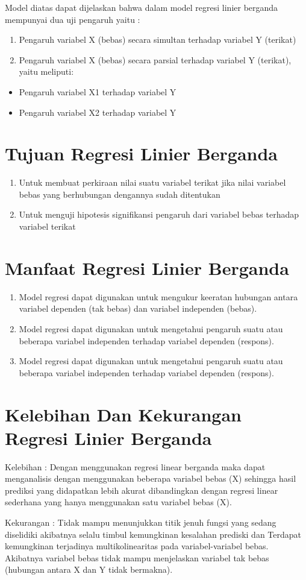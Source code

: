 \par Model diatas dapat dijelaskan bahwa dalam model regresi linier berganda mempunyai dua uji pengaruh yaitu :  
\begin{enumerate}
\item 	Pengaruh variabel X (bebas) secara simultan terhadap variabel Y (terikat)  
\item 	Pengaruh variabel X (bebas) secara parsial terhadap variabel Y (terikat), yaitu meliputi:  
\end{enumerate}
    \begin{itemize}
               \item Pengaruh variabel X1 terhadap variabel Y  
               \item Pengaruh variabel X2 terhadap variabel Y 
               \end{itemize}
\section{Tujuan Regresi Linier Berganda}
\begin{enumerate}
\item Untuk membuat perkiraan nilai suatu variabel terikat jika nilai variabel bebas yang berhubungan dengannya sudah ditentukan
\item Untuk menguji hipotesis signifikansi pengaruh dari variabel bebas terhadap variabel terikat
\end{enumerate}

\section{Manfaat Regresi Linier Berganda}
\begin{enumerate}
\item Model regresi dapat digunakan untuk mengukur keeratan hubungan antara variabel dependen (tak bebas) dan variabel independen (bebas). 
\item Model regresi dapat digunakan untuk mengetahui pengaruh suatu atau beberapa variabel independen terhadap variabel dependen (respons).
\item Model regresi dapat digunakan untuk mengetahui pengaruh suatu atau beberapa variabel independen terhadap variabel dependen (respons).
\end{enumerate}

\section{Kelebihan Dan Kekurangan Regresi Linier Berganda}
\par Kelebihan : Dengan menggunakan regresi linear berganda maka dapat menganalisis dengan menggunakan beberapa variabel bebas (X) sehingga hasil prediksi yang didapatkan lebih akurat dibandingkan dengan regresi linear sederhana yang hanya menggunakan satu variabel bebas (X). 
\par Kekurangan : Tidak mampu menunjukkan titik jenuh fungsi yang sedang diselidiki akibatnya selalu timbul kemungkinan kesalahan prediski dan Terdapat kemungkinan terjadinya multikolinearitas pada variabel-variabel bebas. Akibatnya variabel bebas tidak mampu menjelaskan variabel tak bebas (hubungan antara X dan Y tidak bermakna).

